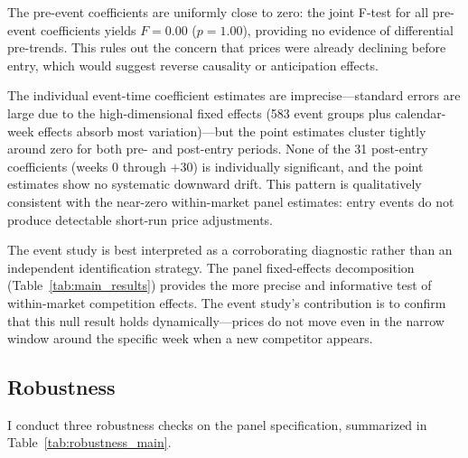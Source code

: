 \documentclass[12pt]{article}
\begin{document}
The pre-event coefficients are uniformly close to zero: the joint F-test for all pre-event coefficients yields $F = 0.00$ ($p = 1.00$), providing no evidence of differential pre-trends. This rules out the concern that prices were already declining before entry, which would suggest reverse causality or anticipation effects.

The individual event-time coefficient estimates are imprecise---standard errors are large due to the high-dimensional fixed effects (583 event groups plus calendar-week effects absorb most variation)---but the point estimates cluster tightly around zero for both pre- and post-entry periods. None of the 31 post-entry coefficients (weeks 0 through $+30$) is individually significant, and the point estimates show no systematic downward drift. This pattern is qualitatively consistent with the near-zero within-market panel estimates: entry events do not produce detectable short-run price adjustments.

The event study is best interpreted as a corroborating diagnostic rather than an independent identification strategy. The panel fixed-effects decomposition (Table~\ref{tab:main_results}) provides the more precise and informative test of within-market competition effects. The event study's contribution is to confirm that this null result holds dynamically---prices do not move even in the narrow window around the specific week when a new competitor appears.

\subsection{Robustness}\label{sec:robustness}

I conduct three robustness checks on the panel specification, summarized in Table~\ref{tab:robustness_main}.
\end{document}
